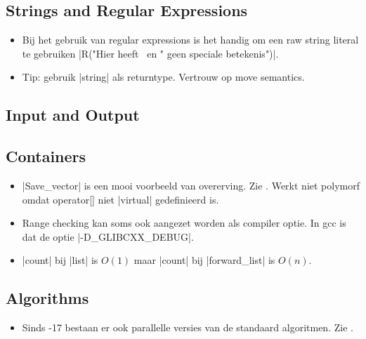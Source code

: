 \begin{cpplstShortInline}
\subsection{Strings and Regular Expressions}
\begin{itemize}
	\item 
	Bij het gebruik van regular expressions is het handig om een raw string literal te gebruiken |R("Hier heeft \ en " geen speciale betekenis")|.
	\item 
	Tip: gebruik |string| als returntype.
	Vertrouw op move semantics.
\end{itemize}
\subsection{Input and Output}
\subsection{Containers}
\begin{itemize}
	\item 
	|Save_vector| is een mooi voorbeeld van overerving.
	Zie .
	Werkt niet polymorf omdat operator[] niet |virtual| gedefinieerd is.
	\item 
	Range checking kan soms ook aangezet worden als compiler optie.
	In gcc is dat de optie |-D_GLIBCXX_DEBUG|.
	\item 
	|count| bij |list| is $O(1)$ maar |count| bij |forward_list| is $O(n)$.	 
\end{itemize}
\subsection{Algorithms}
\begin{itemize}
	\item 
	Sinds \Cpp{}-17 bestaan er ook parallelle versies van de standaard algoritmen.
	Zie .
\end{itemize}

\end{cpplstShortInline}
